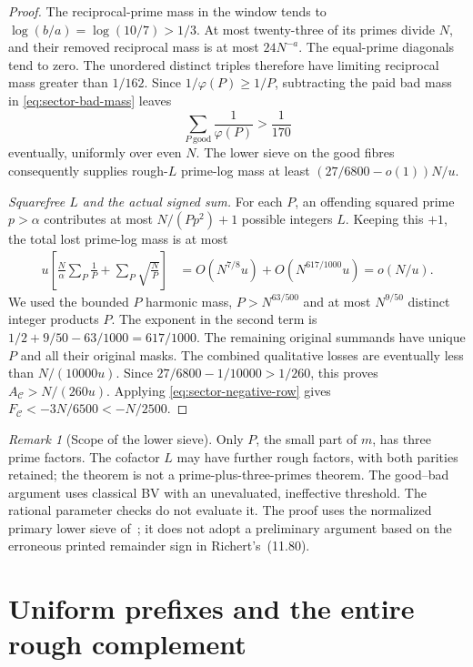 \documentclass[11pt,a4paper]{article}
\theoremstyle{definition}
\theoremstyle{remark}
\newtheorem{remark}[theorem]{Remark}
\begin{document}
\begin{proof}
The reciprocal-prime mass in the window tends to
$\log(b/a)=\log(10/7)>1/3$.  At most twenty-three of its primes
divide $N$, and their removed reciprocal mass is at most $24N^{-a}$.
The equal-prime diagonals tend to zero.  The unordered distinct
triples therefore have limiting reciprocal mass greater than
$1/162$.  Since $1/\varphi(P)\geq1/P$, subtracting the paid bad
mass in \eqref{eq:sector-bad-mass} leaves
\begin{equation}
             \sum_{P\ \mathrm{good}}\frac1{\varphi(P)}>\frac1{170}
 \label{eq:sector-good-harmonic}
\end{equation}
eventually, uniformly over even $N$.  The lower sieve on the good
fibres consequently supplies rough-$L$ prime-log mass at least
$(27/6800-o(1))N/u$.

\emph{Squarefree $L$ and the actual signed sum.}
For each $P$, an offending squared prime $p>\alpha$ contributes
at most $N/(Pp^2)+1$ possible integers $L$.  Keeping this $+1$,
the total lost prime-log mass is at most
\begin{align}
 u\left[\frac N\alpha\sum_P\frac1P
                         +\sum_P\sqrt{\frac NP}\right]
 &=O(N^{7/8}u)+O(N^{617/1000}u)
 =o(N/u).
 \label{eq:sector-squarefree-L-loss}
\end{align}
We used the bounded $P$ harmonic mass, $P>N^{63/500}$ and at most
$N^{9/50}$ distinct integer products $P$.  The exponent in the
second term is $1/2+9/50-63/1000=617/1000$.  The remaining
original summands have unique $P$ and all their original masks.
The combined qualitative losses are eventually less than
$N/(10000u)$.  Since
$27/6800-1/10000>1/260$, this proves
$A_{\mathcal C}>N/(260u)$.  Applying
\eqref{eq:sector-negative-row} gives
$F_{\mathcal C}<-3N/6500<-N/2500$.
\end{proof}

\begin{remark}[Scope of the lower sieve]
Only $P$, the small part of $m$, has three prime factors.  The
cofactor $L$ may have further rough factors, with both parities
retained; the theorem is not a prime-plus-three-primes theorem.
The good--bad argument uses classical BV with an unevaluated,
ineffective threshold.  The rational parameter checks do not
evaluate it.  The proof uses the normalized primary lower sieve
of~\cite{MTZ}; it does not adopt a preliminary argument based on
the erroneous printed remainder sign in Richert's~(11.80).
\end{remark}

\section{Uniform prefixes and the entire rough complement}
\label{sec:sector-eighth-rough}
\end{document}
